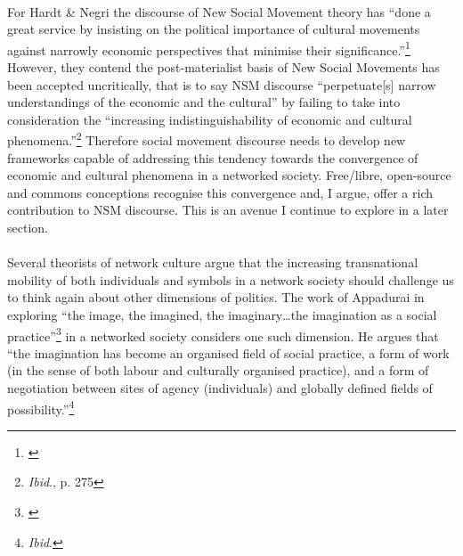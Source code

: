 \paragraph{}For Hardt \& Negri the discourse of New Social Movement theory has ``done a great service by insisting on the political importance of cultural movements against narrowly economic perspectives that minimise their significance.''\footnote{\cite[p. 275]{Hardt:2001jl}} However, they contend the post-materialist basis of New Social Movements has been accepted uncritically, that is to say NSM discourse ``perpetuate[s] narrow understandings of the economic and the cultural'' by failing to take into consideration the ``increasing indistinguishability of economic and cultural phenomena.''\footnote{\textit{Ibid}., p. 275} Therefore social movement discourse needs to develop new frameworks capable of addressing this tendency towards the convergence of economic and cultural phenomena in a networked society. Free/libre, open-source and commons conceptions recognise this convergence and, I argue, offer a rich  contribution to NSM discourse. This is an avenue I continue to explore in a later section.

\paragraph{}Several theorists of network culture argue that the increasing transnational mobility of both individuals and symbols in a network society should challenge us to think again about other dimensions of politics. The work of Appadurai in exploring ``the image, the imagined, the imaginary\ldots the imagination as a social practice''\footnote{\cite[p. 31, original emphasis removed]{Appadurai:1996lp}} in a networked society considers one such dimension. He argues that ``the imagination has become an organised field of social practice, a form of work (in the sense of both labour and culturally organised practice), and a form of negotiation between sites of agency (individuals) and globally defined fields of possibility.''\footnote{\textit{Ibid}.}

